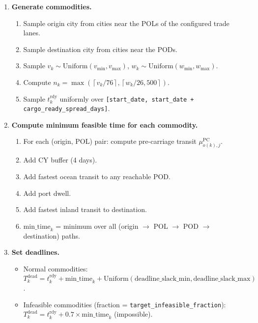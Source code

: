 \documentclass[11pt,a4paper]{article}
\newcommand{\ceil}[1]{\left\lceil #1 \right\rceil}
\theoremstyle{definition}
\begin{document}
\begin{enumerate}
  \item \textbf{Generate commodities.}
    \begin{enumerate}[noitemsep]
      \item Sample origin city from cities near the POLs of the configured trade lanes.
      \item Sample destination city from cities near the PODs.
      \item Sample $v_k \sim \text{Uniform}(v_{\min}, v_{\max})$,
            $w_k \sim \text{Uniform}(w_{\min}, w_{\max})$.
      \item Compute $n_k = \max(\ceil{v_k/76}, \ceil{w_k/26{,}500})$.
      \item Sample $t_k^{\text{rdy}}$ uniformly over \texttt{[start\_date, start\_date + cargo\_ready\_spread\_days]}.
    \end{enumerate}

  \item \textbf{Compute minimum feasible time for each commodity.}
    \begin{enumerate}[noitemsep]
      \item For each (origin, POL) pair: compute pre-carriage transit $\mu_{o(k),j}^{\text{PC}}$.
      \item Add CY buffer (4 days).
      \item Add fastest ocean transit to any reachable POD.
      \item Add port dwell.
      \item Add fastest inland transit to destination.
      \item $\text{min\_time}_k$ = minimum over all (origin $\to$ POL $\to$ POD $\to$ destination) paths.
    \end{enumerate}

  \item \textbf{Set deadlines.}
    \begin{itemize}[noitemsep]
      \item Normal commodities: $T_k^{\text{dead}} = t_k^{\text{rdy}} + \text{min\_time}_k
            + \text{Uniform}(\text{deadline\_slack\_min}, \text{deadline\_slack\_max})$.
      \item Infeasible commodities (fraction = \texttt{target\_infeasible\_fraction}):
            $T_k^{\text{dead}} = t_k^{\text{rdy}} + 0.7 \times \text{min\_time}_k$ (impossible).
    \end{itemize}


\end{enumerate}
\end{document}
